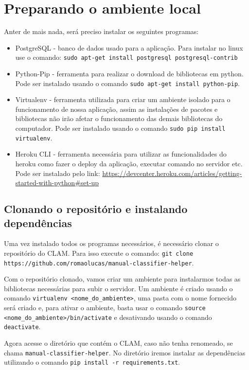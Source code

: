 \section{Preparando o ambiente local}

Anter de mais nada, será preciso instalar os seguintes programas:

\begin{itemize}
	\item PostgreSQL - banco de dados usado para a aplicação. Para instalar no linux
	use o comando: \texttt{sudo apt-get install postgresql postgresql-contrib}
	\item Python-Pip - ferramenta para realizar o download de bibliotecas em python.
	Pode ser instalado usando o comando \texttt{sudo apt-get install python-pip}.
	\item Virtualenv - ferramenta utilizada para criar um ambiente isolado para
	o funcionamento de nossa aplicação, assim as instalações de pacotes e bibliotecas
	não irão afetar o funcionamento das demais bibliotecas do computador. Pode ser
	instalado usando o comando \texttt{sudo pip install virtualenv}.
	\item Heroku CLI - ferramenta necessária para utilizar as funcionalidades do heroku
	como fazer o deploy da aplicação, executar comando no servidor etc. Pode ser instalado
	pelo link: \url{https://devcenter.heroku.com/articles/getting-started-with-python\#set-up}
\end{itemize}

\subsection{Clonando o repositório e instalando dependências}

Uma vez instalado todos os programas necessários, é necessário clonar o repositório do CLAM.
Para isso execute o comando: \texttt{git clone https://github.com/romaolucas/manual-classifier-helper}.

Com o repositório clonado, vamos criar um ambiente para instalarmos todas as bibliotecas necessárias
para subir o servidor. Um ambiente é criado usando o comando \texttt{virtualenv <nome_do_ambiente>}, 
uma pasta com o nome fornecido será criado e, para ativar o ambiente, basta usar o comando 
\texttt{source <nome_do_ambiente>/bin/activate} e desativando usando o comando \texttt{deactivate}.

Agora acesse o diretório que contém o CLAM, caso não tenha renomeado, se chama \texttt{manual-classifier-helper}.
No diretório iremos instalar as dependências utilizando o comando \texttt{pip install -r requirements.txt}.

